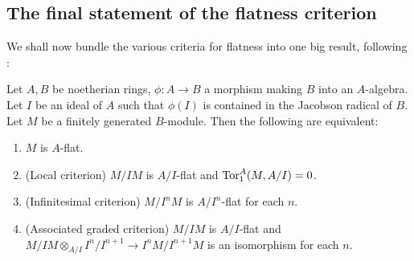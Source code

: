 \subsection{The final statement of the flatness criterion}

We shall now bundle the various criteria for flatness into one big result,
following \cite{SGA1}:

\begin{theorem} \label{bigflatcriterion}
Let $A, B$ be noetherian rings, $\phi: A \to B$ a morphism making $B$ into an
$A$-algebra. Let $I$ be an ideal of $A$ such that $\phi(I)$ is contained in the
Jacobson radical of $B$.
Let $M$ be a finitely generated $B$-module.
Then the following are equivalent:
\begin{enumerate}
\item $M$ is $A$-flat. 
\item (Local criterion) $M/IM$ is $A/I$-flat and $\operatorname{Tor}_1^A(M, A/I) = 0$.
\item (Infinitesimal criterion)  $M/I^n M$ is $A/I^n$-flat for each $n$.
\item (Associated graded criterion)  $M/IM$ is $A/I$-flat and $M/IM \otimes_{A/I} I^n/I^{n+1} \to I^n
M/I^{n+1}M$ is an isomorphism for each $n$.
\end{enumerate}
\end{theorem} 

